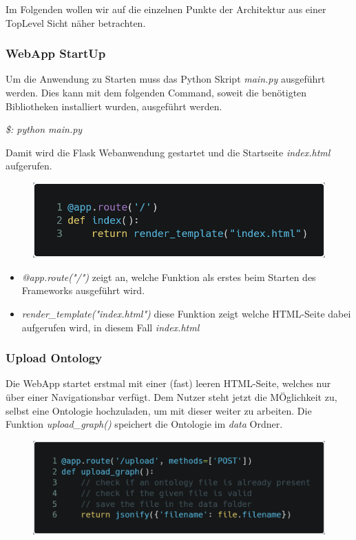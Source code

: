 Im Folgenden wollen wir auf die einzelnen Punkte der Architektur aus einer TopLevel Sicht näher betrachten.

\subsubsection*{WebApp StartUp} 

Um die Anwendung zu Starten muss das Python Skript \textit{main.py} ausgeführt werden.
Dies kann mit dem folgenden Command, soweit die benötigten Bibliotheken installiert wurden, ausgeführt werden.

\textit{\$: python main.py}

Damit wird die Flask Webanwendung gestartet und die Startseite \textit{index.html} aufgerufen.

\begin{figure}[!ht]
    \includegraphics[scale=0.35]{Graphics/def_index.png}
    \end{figure}

    \begin{itemize}
        \item \textit{@app.route("/")} zeigt an, welche Funktion als erstes beim Starten des Frameworks ausgeführt wird.
        \item \textit{render\_template("index.html")} diese Funktion zeigt welche HTML-Seite dabei aufgerufen wird, in diesem Fall \textit{index.html}
    \end{itemize}

\subsubsection*{Upload Ontology}

Die WebApp startet erstmal mit einer (fast) leeren HTML-Seite, welches nur über einer Navigationsbar verfügt.
Dem Nutzer steht jetzt die MÖglichkeit zu, selbst eine Ontologie hochzuladen, um mit dieser weiter zu arbeiten.
Die Funktion \textit{upload\_graph()} speichert die Ontologie im \textit{data} Ordner.
\begin{figure}[!ht]
    \includegraphics[scale=0.2]{Graphics/upload_graph.png}
    \end{figure}

